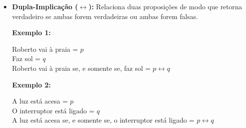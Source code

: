 \begin{itemize}[left=0.5cm, align=left, nosep]
                    \textbf{Exemplo 2:} Se chover, a rua estará molhada.
                
                    \begin{itemize}[left=0.5cm, nosep, label=$\hookrightarrow$]
                        \item A rua pode estar molhada por outro motivo.
                    \end{itemize}
                
                    \textbf{Exemplo 3:}
                    \begin{enumerate}[label=\arabic*., left=0.5cm, align=left, nosep]
                        \item O carro $x$ é roubado, e a seguradora paga $y$.
                        \item O carro $x$ é roubado, mas a seguradora não paga $y$.
                        \item O carro $x$ não é roubado, e a seguradora paga $y$.
                        \item O carro $x$ não é roubado, e a seguradora não paga $y$.
                    \end{enumerate}

                \item \textbf{Dupla-Implicação ($\leftrightarrow$):} Relaciona duas proposições de modo que retorna verdadeiro se ambas forem verdadeiras ou ambas forem falsas.
                
                    \textbf{Exemplo 1:}      
                    \begin{center}
                        Roberto vai à praia = $p$ \\
                        Faz sol = $q$ \\
                        Roberto vai à praia se, e somente se, faz sol = $p \leftrightarrow q$
                    \end{center}    
                    \textbf{Exemplo 2:}      
                    \begin{center}
                        A luz está acesa = $p$ \\
                        O interruptor está ligado = $q$ \\
                        A luz está acesa se, e somente se, o interruptor está ligado = $p \leftrightarrow q$
                    \end{center}    

            \end{itemize}
      
